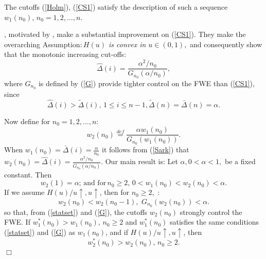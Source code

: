 \documentclass[12pt,fleqn] {article}
\begin{document}
The cutoffs (\ref{Holm}), (\ref{CS1})  satisfy the description of such  a sequence $w_1(n_0),\,  n_0=1,2,\ldots,n.$ 


\cite{sarkarImprovingHolmProcedure2016}, motivated by \cite{senetaSimpleStepwiseTests2005}, make a substantial improvement on (\ref{CS1}). They make the overarching  Assumption:\,{\it $H(u)$ is convex in $u \in (0,1),$ } and consequently show that the monotonic increasing cut-offs:
\begin{equation} \label{Sark}
  {\hat \Delta}(i) = \frac{\alpha^2/ n_0}{G_{n_0}(\alpha/n_0)}, 
\end{equation}where $G_{n_0}$ is defined by (\ref{G})
provide tighter control on the FWE than  (\ref{CS1}), since 
\begin{equation} \label{Sa1}
{\hat \Delta}(i) > {\tilde \Delta}(i), \, 1 \leq i \leq n-1, {\tilde \Delta}(n) = {\bar \Delta}(n) = \alpha.
\end{equation}

Now define for $n_0 = 1,2,\ldots,n$: 
\begin{equation} \label{w3*}
w_2(n_0) \stackrel{def}{=} \frac{\alpha w_1(n_0)}{G_{n_0}(w_1(n_0))}.
\end{equation}  When $w_1(n_0) ={\bar\Delta}(i) =\frac{\alpha}{n_0}$ it follows from (\ref{Sark}) that $ w_2(n_0) = {\hat \Delta}(i) = \frac{\alpha^2/ n_0}{G_{n_0}(\alpha/n_0)}.$ Our main result is:\newline {} Let $\alpha, 0 < \alpha <1,$ be a fixed constant. Then
\begin{equation} \label{w22*} 
w_2(1) = \alpha; \, \text{and for} \, n_0 \geq 2, \, 0 < w_1(n_0)< w_2(n_0) < \alpha.\end{equation}If we assume $H(u)/u \uparrow, u \uparrow$, then for $n_0 \geq 2,$ :
\begin{equation} \label{w2*} 
 w_2(n_0) < w_2(n_0 -1), \, \,  G_{n_0}(w_2(n_0)) < \alpha. \end{equation}
so that, from (\ref{statset}) and (\ref{G}), the cutoffs $w_2(n_0)$ strongly control the FWE.
 \newline If  $w_1^{*}(n_0) > w_1(n_0), \, n_{0} \geq 2 $ and $w_1^{*}(n_0) $ satisfies the same conditions (\ref{statset}) and (\ref{G}) as $w_1(n_0)$, and if
$H(u)/u \uparrow, u \uparrow$, then 
\begin{equation}\label{w221*}
 w_2^{*}(n_0) > w_2(n_0), \, n_0 \geq 2. \end{equation} \hfill $\Box$
\end{document}
